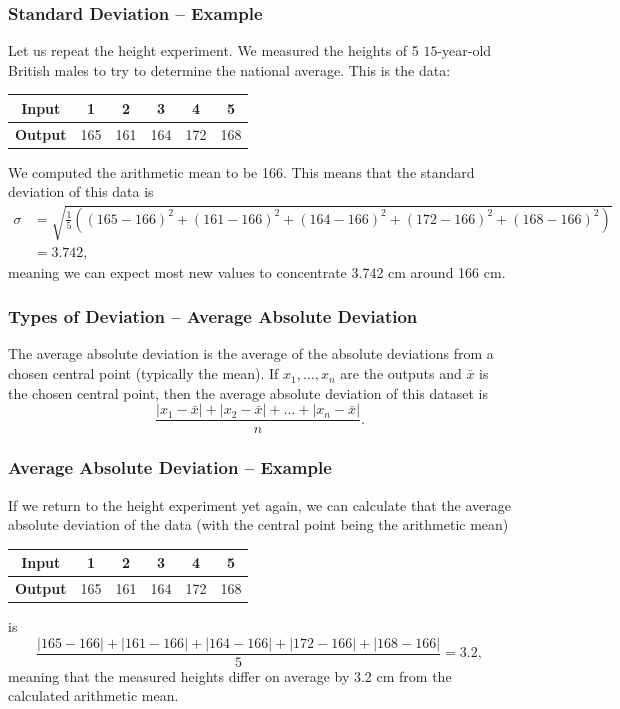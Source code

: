 \documentclass[aspectratio=169,11pt,svgnames]{beamer}
\begin{document}
\begin{frame}
 \frametitle{Standard Deviation -- Example}
 Let us repeat the height experiment. We measured the heights of 5 $15$-year-old
 British males to try to determine the national average. This is the data:
 \begin{center}
  \begin{tabular}{c|ccccc}
   \textbf{Input} & 1 & 2 & 3 & 4 & 5\\
   \midrule
   \textbf{Output} & 165 & 161 & 164 & 172 & 168
  \end{tabular}
 \end{center}
 \pause
 We computed the arithmetic mean to be 166. This means that the standard
 deviation of this data is
 \begin{align*}
  \sigma &= \sqrt{\frac{1}{5}((165 - 166)^2 + (161 -166)^2 + (164 - 166)^2 +
  (172-166)^2 + (168-166)^2)}\\
         &= 3.742,
 \end{align*}
 meaning we can expect most new values to concentrate 3.742 cm around 166 cm.
\end{frame}

\begin{frame}
 \frametitle{Types of Deviation -- Average Absolute Deviation}
 \begin{tcolorbox}[title=Average Absolute Deviation]
  The \alert{average absolute deviation} is the average of the absolute
  deviations from a chosen central point (typically the mean). If
  $x_1,\ldots,x_n$ are the outputs and $\bar{x}$ is the chosen central point,
  then the average absolute deviation of this dataset is
  \[
   \frac{|x_1 - \bar{x}| + |x_2 - \bar{x}| + \ldots + |x_n -\bar{x}|}{n}.
  \]
 \end{tcolorbox}
\end{frame}

\begin{frame}
 \frametitle{Average Absolute Deviation -- Example}
 If we return to the height experiment yet again, we can calculate that the
 average absolute deviation of the data (with the central point being the
 arithmetic mean)
 \begin{center}
  \begin{tabular}{c|ccccc}
   \textbf{Input} & 1 & 2 & 3 & 4 & 5\\
   \midrule
   \textbf{Output} & 165 & 161 & 164 & 172 & 168
  \end{tabular}
 \end{center}
 \pause
 is
 \[
  \frac{|165 - 166| + |161 - 166| + |164 - 166| + |172 - 166| + |168 - 166|}{5}
  = 3.2,
 \]
 \pause
 meaning that the measured heights differ on average by 3.2 cm from the
 calculated arithmetic mean.
\end{frame}
\end{document}
